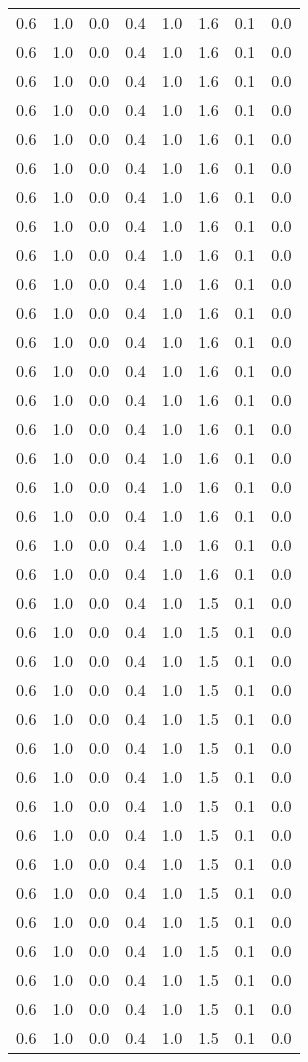 \begin{tabular}{L{1in}|L{1in}|L{1in}|L{1in}|L{1in}|L{1in}|L{1in}|L{1in}}
0.6&1.0&0.0&0.4&1.0&1.6&0.1&0.0\\
0.6&1.0&0.0&0.4&1.0&1.6&0.1&0.0\\
0.6&1.0&0.0&0.4&1.0&1.6&0.1&0.0\\
0.6&1.0&0.0&0.4&1.0&1.6&0.1&0.0\\
0.6&1.0&0.0&0.4&1.0&1.6&0.1&0.0\\
0.6&1.0&0.0&0.4&1.0&1.6&0.1&0.0\\
0.6&1.0&0.0&0.4&1.0&1.6&0.1&0.0\\
0.6&1.0&0.0&0.4&1.0&1.6&0.1&0.0\\
0.6&1.0&0.0&0.4&1.0&1.6&0.1&0.0\\
0.6&1.0&0.0&0.4&1.0&1.6&0.1&0.0\\
0.6&1.0&0.0&0.4&1.0&1.6&0.1&0.0\\
0.6&1.0&0.0&0.4&1.0&1.6&0.1&0.0\\
0.6&1.0&0.0&0.4&1.0&1.6&0.1&0.0\\
0.6&1.0&0.0&0.4&1.0&1.6&0.1&0.0\\
0.6&1.0&0.0&0.4&1.0&1.6&0.1&0.0\\
0.6&1.0&0.0&0.4&1.0&1.6&0.1&0.0\\
0.6&1.0&0.0&0.4&1.0&1.6&0.1&0.0\\
0.6&1.0&0.0&0.4&1.0&1.6&0.1&0.0\\
0.6&1.0&0.0&0.4&1.0&1.6&0.1&0.0\\
0.6&1.0&0.0&0.4&1.0&1.6&0.1&0.0\\
0.6&1.0&0.0&0.4&1.0&1.5&0.1&0.0\\
0.6&1.0&0.0&0.4&1.0&1.5&0.1&0.0\\
0.6&1.0&0.0&0.4&1.0&1.5&0.1&0.0\\
0.6&1.0&0.0&0.4&1.0&1.5&0.1&0.0\\
0.6&1.0&0.0&0.4&1.0&1.5&0.1&0.0\\
0.6&1.0&0.0&0.4&1.0&1.5&0.1&0.0\\
0.6&1.0&0.0&0.4&1.0&1.5&0.1&0.0\\
0.6&1.0&0.0&0.4&1.0&1.5&0.1&0.0\\
0.6&1.0&0.0&0.4&1.0&1.5&0.1&0.0\\
0.6&1.0&0.0&0.4&1.0&1.5&0.1&0.0\\
0.6&1.0&0.0&0.4&1.0&1.5&0.1&0.0\\
0.6&1.0&0.0&0.4&1.0&1.5&0.1&0.0\\
0.6&1.0&0.0&0.4&1.0&1.5&0.1&0.0\\
0.6&1.0&0.0&0.4&1.0&1.5&0.1&0.0\\
0.6&1.0&0.0&0.4&1.0&1.5&0.1&0.0\\
0.6&1.0&0.0&0.4&1.0&1.5&0.1&0.0\\

\end{tabular}
